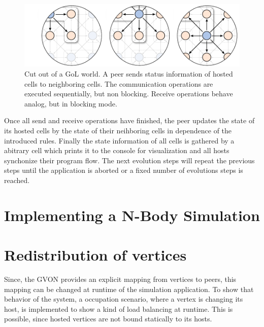 \begin{figure}[H]
  \centering
  \includegraphics[width=\textwidth]{graphics/40_gol_communication}
  \caption{Cut out of a GoL world. A peer sends status information of
    hosted cells to neighboring cells. The communication operations
    are executed sequentially, but non blocking. Receive operations
    behave analog, but in blocking mode.}
  \label{fig:gol_communication}
\end{figure}

Once all send and receive operations have finished, the peer updates
the state of its hosted cells by the state of their neihboring cells
in dependence of the introduced rules. Finally the state information
of all cells is gathered by a abitrary cell which prints it to the
console for visualization and all hosts synchonize their program flow.
The next evolution steps will repeat the previous steps until the
application is aborted or a fixed number of evolutions steps is
reached.

\section{Implementing a N-Body Simulation}

\section{Redistribution of vertices}

Since, the GVON provides an explicit mapping from vertices to peers,
this mapping can be changed at runtime of the simulation application.
To show that behavior of the system, a occupation scenario, where a
vertex is changing its host, is implemented to show a kind of load
balancing at runtime. This is possible, since hosted vertices are not
bound statically to its hosts.

